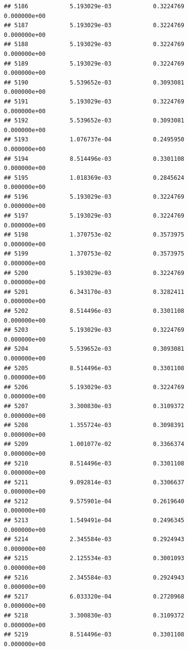 \documentclass[
]{article}
\begin{document}
\begin{verbatim}
## 5186            5.193029e-03            0.3224769            0.000000e+00
## 5187            5.193029e-03            0.3224769            0.000000e+00
## 5188            5.193029e-03            0.3224769            0.000000e+00
## 5189            5.193029e-03            0.3224769            0.000000e+00
## 5190            5.539652e-03            0.3093081            0.000000e+00
## 5191            5.193029e-03            0.3224769            0.000000e+00
## 5192            5.539652e-03            0.3093081            0.000000e+00
## 5193            1.076737e-04            0.2495950            0.000000e+00
## 5194            8.514496e-03            0.3301108            0.000000e+00
## 5195            1.018369e-03            0.2845624            0.000000e+00
## 5196            5.193029e-03            0.3224769            0.000000e+00
## 5197            5.193029e-03            0.3224769            0.000000e+00
## 5198            1.370753e-02            0.3573975            0.000000e+00
## 5199            1.370753e-02            0.3573975            0.000000e+00
## 5200            5.193029e-03            0.3224769            0.000000e+00
## 5201            6.343170e-03            0.3282411            0.000000e+00
## 5202            8.514496e-03            0.3301108            0.000000e+00
## 5203            5.193029e-03            0.3224769            0.000000e+00
## 5204            5.539652e-03            0.3093081            0.000000e+00
## 5205            8.514496e-03            0.3301108            0.000000e+00
## 5206            5.193029e-03            0.3224769            0.000000e+00
## 5207            3.300830e-03            0.3109372            0.000000e+00
## 5208            1.355724e-03            0.3098391            0.000000e+00
## 5209            1.001077e-02            0.3366374            0.000000e+00
## 5210            8.514496e-03            0.3301108            0.000000e+00
## 5211            9.092814e-03            0.3306637            0.000000e+00
## 5212            9.575901e-04            0.2619640            0.000000e+00
## 5213            1.549491e-04            0.2496345            0.000000e+00
## 5214            2.345584e-03            0.2924943            0.000000e+00
## 5215            2.125534e-03            0.3001093            0.000000e+00
## 5216            2.345584e-03            0.2924943            0.000000e+00
## 5217            6.033320e-04            0.2720968            0.000000e+00
## 5218            3.300830e-03            0.3109372            0.000000e+00
## 5219            8.514496e-03            0.3301108            0.000000e+00

\end{verbatim}
\end{document}
